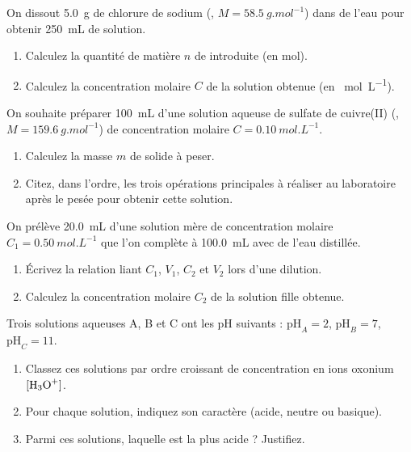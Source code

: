 \documentclass[11pt]{article}
\begin{document}
\begin{exercice}
\label{exo:conc}
On dissout \SI{5,0}{g} de chlorure de sodium (, $M = \SI{58,5}{g.mol^{-1}}$) dans de l'eau pour obtenir \SI{250}{mL} de solution.
\begin{enumerate}
    \item Calculez la quantité de matière $n$ de  introduite (en mol).
    \item Calculez la concentration molaire $C$ de la solution obtenue (en \SI{}{mol.L^{-1}}).
\end{enumerate}
\end{exercice}

\begin{exercice}
\label{exo:prepa}
On souhaite préparer \SI{100}{mL} d'une solution aqueuse de sulfate de cuivre(II) (, $M = \SI{159,6}{g.mol^{-1}}$) de concentration molaire $C = \SI{0,10}{mol.L^{-1}}$.
\begin{enumerate}
    \item Calculez la masse $m$ de  solide à peser.
    \item Citez, dans l'ordre, les trois opérations principales à réaliser au laboratoire après le pesée pour obtenir cette solution.
\end{enumerate}
\end{exercice}

\begin{exercice}
\label{exo:dilution}
On prélève \SI{20,0}{mL} d'une solution mère de concentration molaire $C_1 = \SI{0,50}{mol.L^{-1}}$ que l'on complète à \SI{100,0}{mL} avec de l'eau distillée.
\begin{enumerate}
    \item Écrivez la relation liant $C_1$, $V_1$, $C_2$ et $V_2$ lors d'une dilution.
    \item Calculez la concentration molaire $C_2$ de la solution fille obtenue.
\end{enumerate}
\end{exercice}

\begin{exercice}
\label{exo:ph}
Trois solutions aqueuses A, B et C ont les pH suivants : $\text{pH}_A = 2$, $\text{pH}_B = 7$, $\text{pH}_C = 11$.
\begin{enumerate}
    \item Classez ces solutions par ordre croissant de concentration en ions oxonium $[\ce{H3O+}]$.
    \item Pour chaque solution, indiquez son caractère (acide, neutre ou basique).
    \item Parmi ces solutions, laquelle est la plus acide ? Justifiez.
\end{enumerate}
\end{exercice}
\end{document}
